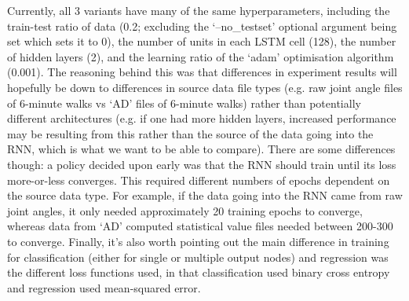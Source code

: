 \documentclass[12pt,twoside]{report}
\begin{document}
\quad Currently, all 3 variants have many of the same hyperparameters, including the train-test ratio of data (0.2; excluding the ‘--no\_testset’ optional argument being set which sets it to 0), the number of units in each LSTM cell (128), the number of hidden layers (2), and the learning ratio of the ‘adam’ optimisation algorithm (0.001). The reasoning behind this was that differences in experiment results will hopefully be down to differences in source data file types (e.g. raw joint angle files of 6-minute walks vs ‘AD’ files of 6-minute walks) rather than potentially different architectures (e.g. if one had more hidden layers, increased performance may be resulting from this rather than the source of the data going into the RNN, which is what we want to be able to compare). There are some differences though: a policy decided upon early was that the RNN should train until its loss more-or-less converges. This required different numbers of epochs dependent on the source data type. For example, if the data going into the RNN came from raw joint angles, it only needed approximately 20 training epochs to converge, whereas data from ‘AD’ computed statistical value files needed between 200-300 to converge. Finally, it’s also worth pointing out the main difference in training for classification (either for single or multiple output nodes) and regression was the different loss functions used, in that classification used binary cross entropy and regression used mean-squared error.\\
\end{document}
